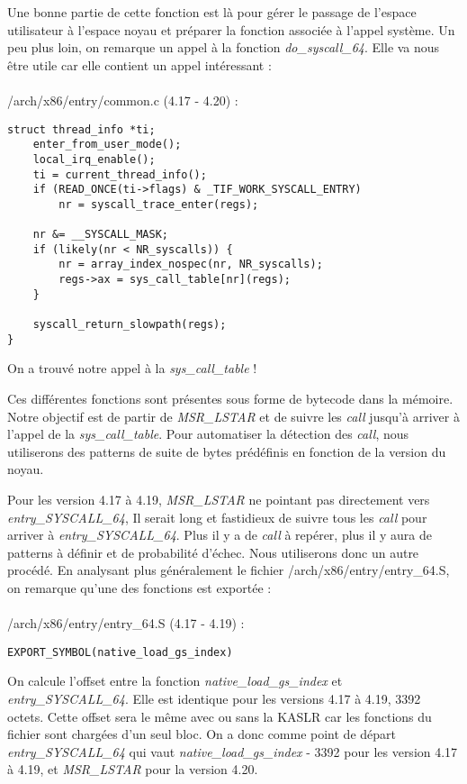 \documentclass[journal, a4paper]{IEEEtran}
\begin{document}
Une bonne partie de cette fonction est là pour gérer le passage de l'espace utilisateur à l'espace noyau et préparer la fonction associée à l'appel système. Un peu plus loin, on remarque un appel à la fonction \textit{do\_syscall\_64}. Elle va nous être utile car elle contient un appel intéressant :
\\
\\
/arch/x86/entry/common.c (4.17 - 4.20) :
\begin{lstlisting}[style=CStyle]
struct thread_info *ti;
	enter_from_user_mode();
	local_irq_enable();
	ti = current_thread_info();
	if (READ_ONCE(ti->flags) & _TIF_WORK_SYSCALL_ENTRY)
		nr = syscall_trace_enter(regs);

	nr &= __SYSCALL_MASK;
	if (likely(nr < NR_syscalls)) {
		nr = array_index_nospec(nr, NR_syscalls);
		regs->ax = sys_call_table[nr](regs);
	}

	syscall_return_slowpath(regs);
}
\end{lstlisting}
On a trouvé notre appel à la \textit{sys\_call\_table} !

Ces différentes fonctions sont présentes sous forme de bytecode dans la mémoire. Notre objectif est de partir de \textit{MSR\_LSTAR} et de suivre les \textit{call} jusqu'à arriver à l'appel de la \textit{sys\_call\_table}. Pour automatiser la détection des \textit{call}, nous utiliserons des patterns de suite de bytes prédéfinis en fonction de la version du noyau.

Pour les version 4.17 à 4.19, \textit{MSR\_LSTAR} ne pointant pas directement vers \textit{entry\_SYSCALL\_64}, Il serait long et fastidieux de suivre tous les \textit{call} pour arriver à \textit{entry\_SYSCALL\_64}. Plus il y a de \textit{call} à repérer, plus il y aura de patterns à définir et de probabilité d'échec. Nous utiliserons donc un autre procédé. En analysant plus généralement le fichier /arch/x86/entry/entry\_64.S, on remarque qu'une des fonctions est exportée :
\\
\\
/arch/x86/entry/entry\_64.S (4.17 - 4.19) :
\begin{lstlisting}[style=CStyle]
EXPORT_SYMBOL(native_load_gs_index)
\end{lstlisting}
On calcule l'offset entre la fonction \textit{native\_load\_gs\_index} et \textit{entry\_SYSCALL\_64}. Elle est identique pour les versions 4.17 à 4.19, 3392 octets. Cette offset sera le même avec ou sans la KASLR car les fonctions du fichier sont chargées d'un seul bloc. On a donc comme point de départ \textit{entry\_SYSCALL\_64} qui vaut \textit{native\_load\_gs\_index} - 3392 pour les version 4.17 à 4.19, et \textit{MSR\_LSTAR} pour la version 4.20.
\end{document}
